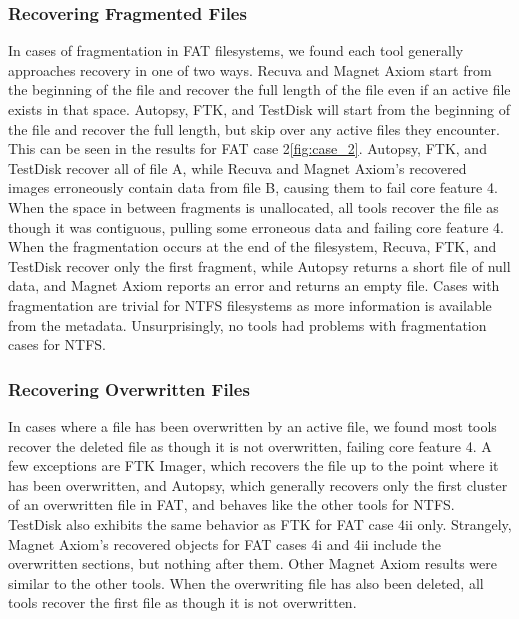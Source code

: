 \subsubsection{Recovering Fragmented Files}
In cases of fragmentation in FAT filesystems, we found each tool generally approaches recovery in one of two ways. 
Recuva and Magnet Axiom start from the beginning of the file and recover the full length of the file even if an active file exists in that space. 
Autopsy, FTK, and TestDisk will start from the beginning of the file and recover the full length, but skip over any active files they encounter. 
This can be seen in the results for FAT case 2\ref{fig:case_2}. 
Autopsy, FTK, and TestDisk recover all of file A, while Recuva and Magnet Axiom's recovered images erroneously contain data from file B, causing them to fail core feature 4. 
When the space in between fragments is unallocated, all tools recover the file as though it was contiguous, pulling some erroneous data and failing core feature 4. 
When the fragmentation occurs at the end of the filesystem, Recuva, FTK, and TestDisk recover only the first fragment, while Autopsy returns a short file of null data, and Magnet Axiom reports an error and returns an empty file.
Cases with fragmentation are trivial for NTFS filesystems as more information is available from the metadata. 
Unsurprisingly, no tools had problems with fragmentation cases for NTFS.

\subsubsection{Recovering Overwritten Files}
In cases where a file has been overwritten by an active file, we found most tools recover the deleted file as though it is not overwritten, failing core feature 4. 
A few exceptions are FTK Imager, which recovers the file up to the point where it has been overwritten, and Autopsy, which generally recovers only the first cluster of an overwritten file in FAT, and behaves like the other tools for NTFS. 
TestDisk also exhibits the same behavior as FTK for FAT case 4ii only. 
Strangely, Magnet Axiom's recovered objects for FAT cases 4i and 4ii include the overwritten sections, but nothing after them.
Other Magnet Axiom results were similar to the other tools.
When the overwriting file has also been deleted, all tools recover the first file as though it is not overwritten.

